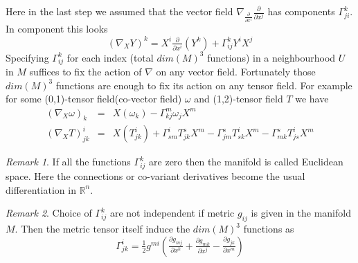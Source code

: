 \documentclass[a4paper]{report}
\theoremstyle{definition}
\theoremstyle{remark}
\newtheorem*{remark}{Remark}
\begin{document}
		Here in the last step we assumed that the vector field $\nabla_{\tfrac{\partial}{\partial x^i}}\tfrac{\partial}{\partial x^j}$ has components $\Gamma_{ji}^{k}$. In component this looks
		\begin{equation*}
			(\nabla_XY)^k = X^i\tfrac{\partial}{\partial x^i}(Y^k) + \Gamma_{ij}^{k}Y^iX^j 
		\end{equation*} 
		Specifying $\Gamma_{ij}^{k}$ for each index (total $dim(M)^3$ functions) in a neighbourhood $U$ in $M$ suffices to fix the action of $\nabla$ on any vector field. Fortunately those $dim(M)^3$ functions are enough to fix its action on any tensor field. For example for some (0,1)-tensor field(co-vector field) $\omega$ and (1,2)-tensor field $T$ we have
		\begin{eqnarray*}
			(\nabla_X\omega)_k &=& X(\omega_k) - \Gamma_{kj}^{m}\omega_jX^m  \\
			(\nabla_XT)_{jk}^{i} &=& X(T_{jk}^{i}) + \Gamma_{sm}^{i}T_{jk}^{s}X^m - \Gamma_{jm}^{s}T_{sk}^{i}X^m - \Gamma_{mk}^{s}T_{js}^{i}X^m
		\end{eqnarray*}
		\begin{remark}
			If all the functions $\Gamma_{ij}^{k}$ are zero then the manifold is called Euclidean space. Here the connections or co-variant derivatives become the usual differentiation in $\mathbb{R}^n$.
		\end{remark}
		\begin{remark}
			Choice of $\Gamma_{ij}^{k}$ are not independent if metric $g_{ij}$ is given in the manifold $M$. Then the metric tensor itself induce the $dim(M)^3$ functions as 
			\begin{equation*}
				\Gamma_{jk}^{i} = \tfrac{1}{2} g^{mi}\left(\tfrac{\partial g_{mj}}{\partial x^k} + \tfrac{\partial g_{mk}}{\partial x^j} - \tfrac{\partial g_{jk}}{\partial x^m} \right)
			\end{equation*}
		\end{remark}
\end{document}
